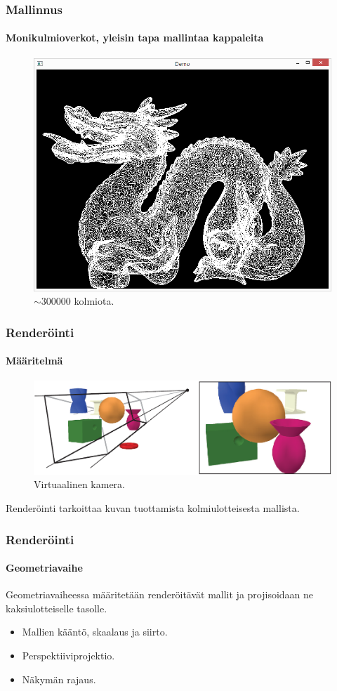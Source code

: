 \documentclass{beamer}
\begin{document}
\begin{frame}
\frametitle{Mallinnus}
\framesubtitle{Monikulmioverkot, yleisin tapa mallintaa kappaleita}
\begin{figure}
\includegraphics[scale=0.3]{img/dragon_wf.png}
\caption{$\sim300000$ kolmiota.}
\end{figure}
\end{frame}

\begin{frame}
\frametitle{Renderöinti}
\framesubtitle{Määritelmä}
\begin{figure}
\includegraphics[scale=0.3]{img/projection.png}
\caption{Virtuaalinen kamera.~\cite{Moller}}
\end{figure}
Renderöinti tarkoittaa kuvan tuottamista kolmiulotteisesta mallista.
\end{frame}

\begin{frame}
\frametitle{Renderöinti}
\framesubtitle{Geometriavaihe}
Geometriavaiheessa määritetään renderöitävät mallit ja projisoidaan ne kaksiulotteiselle tasolle.
\begin{itemize}
\item Mallien kääntö, skaalaus ja siirto.
\item Perspektiiviprojektio.
\item Näkymän rajaus.
\end{itemize}
\end{frame}
\end{document}
